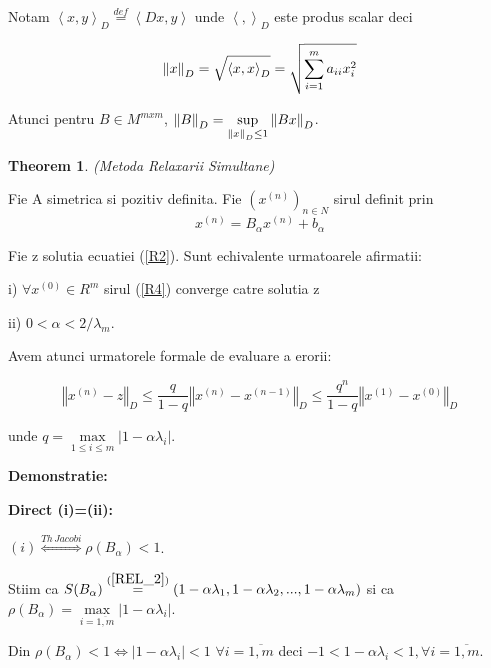 \documentclass[a4paper,twoside]{book}
\newtheorem{theorem}{Theorem}
\begin{document}
Notam $\left\langle x,y\right\rangle _{D}\overset{def}{=}\left\langle
Dx,y\right\rangle $ unde $\left\langle ,\right\rangle _{D}$ este produs
scalar deci

\begin{equation*}
\left\Vert x\right\Vert _{D}=\sqrt{\left\langle x,x\right\rangle _{D}}=\sqrt{%
\sum_{i=1}^{m}a_{ii}x_{i}^{2}}
\end{equation*}

Atunci pentru $B\in M^{mxm}$, $\left\Vert B\right\Vert _{D}=\underset{%
\left\Vert x\right\Vert _{D}\leq 1}{\sup }\left\Vert Bx\right\Vert _{D}$.

\begin{theorem}
(Metoda Relaxarii Simultane)\label{REL_3}
\end{theorem}

Fie A simetrica si pozitiv definita. Fie $(x^{(n)})_{n\in N}$ sirul definit
prin 
\begin{equation}
x^{(n)}=B_{\alpha }x^{(n)}+b_{\alpha }  \label{R4}
\end{equation}

Fie z solutia ecuatiei (\ref{R2}). Sunt echivalente urmatoarele afirmatii:

i) $\forall x^{(0)}\in R^{m}$ sirul (\ref{R4}) converge catre solutia z

ii) $0<\alpha <2/\lambda _{m}$.

Avem atunci urmatorele formale de evaluare a erorii:

\begin{equation}
\left\Vert x^{(n)}-z\right\Vert _{D}\leq \frac{q}{1-q}\left\Vert
x^{(n)}-x^{(n-1)}\right\Vert _{D}\leq \frac{q^{n}}{1-q}\left\Vert
x^{(1)}-x^{(0)}\right\Vert _{D}  \label{R5}
\end{equation}

unde $q=\underset{1\leq i\leq m}{\max }\left\vert 1-\alpha \lambda
_{i}\right\vert $.

\textbf{Demonstratie:}

\textbf{Direct (i)=\TEXTsymbol{>}(ii):}

$(i)\overset{Th\,Jacobi}{\Leftrightarrow }\rho (B_{\alpha })<1$.

Stiim ca $S(B_{\alpha })\overset{(\ref{REL_2})}{=}(1-\alpha \lambda
_{1},1-\alpha \lambda _{2},...,1-\alpha \lambda _{m})$ si ca $\rho
(B_{\alpha })=\underset{i=\overline{1,m}}{\max }\left\vert 1-\alpha \lambda
_{i}\right\vert $.

Din $\rho (B_{\alpha })<1\Leftrightarrow \left\vert 1-\alpha \lambda
_{i}\right\vert <1$ $\forall i=\overline{1,m}$ deci $-1<1-\alpha \lambda
_{i}<1,\forall i=\overline{1,m}$.
\end{document}
